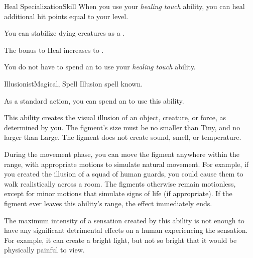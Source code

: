 \begin{feat}{Heal Specialization}{Skill}
         When you use your \textit{healing touch} ability, you can heal additional hit points equal to your level.

         You can stabilize dying creatures as a .

         The bonus to Heal increases to .

         You do not have to spend an  to use your \textit{healing touch} ability.
    \end{feat}

    \begin{feat}{Illusionist}{Magical, Spell}
        \featpre Illusion spell known.
        \featben

         As a standard action, you can spend an  to use this ability.
        \begin{ability}
            \begin{spelltargetinginfo}
                \spellrng{\rngmed}
            \end{spelltargetinginfo}
            \begin{spelleffects}
                \spelleffect This ability creates the visual illusion of an object, creature, or force, as determined by you.
                The figment's size must be no smaller than Tiny, and no larger than Large.
                The figment does not create sound, smell, or temperature.

                During the movement phase, you can move the figment anywhere within the range, with appropriate motions to simulate natural movement.
                For example, if you created the illusion of a squad of human guards, you could cause them to walk realistically across a room.
                The figments otherwise remain motionless, except for minor motions that simulate signs of life (if appropriate).
                If the figment ever leaves this ability's range, the effect immediately ends.

                The maximum intensity of a sensation created by this ability is not enough to have any significant detrimental effects on a human experiencing the sensation.
                For example, it can create a bright light, but not so bright that it would be physically painful to view.


\end{spelleffects}
\end{ability}
\end{feat}
